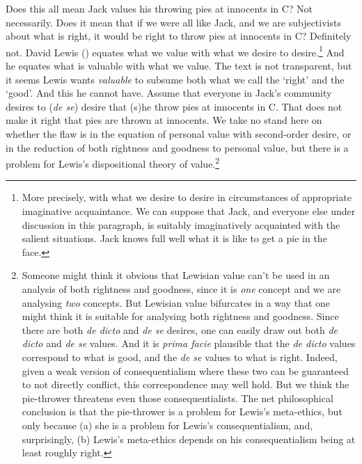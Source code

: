 \documentclass[
  10pt,
  letterpaper,
  DIV=11,
  numbers=noendperiod,
  twoside]{scrartcl}
\begin{document}
Does this all mean Jack values his throwing pies at innocents in C? Not
necessarily. Does it mean that if we were all like Jack, and we are
subjectivists about what is right, it would be right to throw pies at
innocents in C? Definitely not. David Lewis
() equates what we value with what we
desire to desire.\footnote{More precisely, with what we desire to desire
  in circumstances of appropriate imaginative acquaintance. We can
  suppose that Jack, and everyone else under discussion in this
  paragraph, is suitably imaginatively acquainted with the salient
  situations. Jack knows full well what it is like to get a pie in the
  face.} And he equates what is valuable with what we value. The text is
not transparent, but it seems Lewis wants \emph{valuable} to subsume
both what we call the `right' and the `good'. And this he cannot have.
Assume that everyone in Jack's community desires to (\emph{de se})
desire that (s)he throw pies at innocents in C. That does not make it
right that pies are thrown at innocents. We take no stand here on
whether the flaw is in the equation of personal value with second-order
desire, or in the reduction of both rightness and goodness to personal
value, but there is a problem for Lewis's dispositional theory of
value.\footnote{Someone might think it obvious that Lewisian value can't
  be used in an analysis of both rightness and goodness, since it is
  \emph{one} concept and we are analysing \emph{two} concepts. But
  Lewisian value bifurcates in a way that one might think it is suitable
  for analysing both rightness and goodness. Since there are both
  \emph{de dicto} and \emph{de se} desires, one can easily draw out both
  \emph{de dicto} and \emph{de se} values. And it is \emph{prima facie}
  plausible that the \emph{de dicto} values correspond to what is good,
  and the \emph{de se} values to what is right. Indeed, given a weak
  version of consequentialism where these two can be guaranteed to not
  directly conflict, this correspondence may well hold. But we think the
  pie-thrower threatens even those consequentialists. The net
  philosophical conclusion is that the pie-thrower is a problem for
  Lewis's meta-ethics, but only because (a) she is a problem for Lewis's
  consequentialism, and, surprisingly, (b) Lewis's meta-ethics depends
  on his consequentialism being at least roughly right.}
\end{document}

